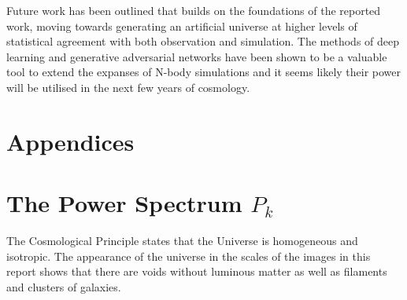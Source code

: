 \documentclass[twocolumn]{article}
\numberwithin{equation}{section}
\begin{document}
Future work has been outlined that builds on the foundations of the reported work, moving towards generating an artificial 
universe at higher levels of statistical agreement with both observation and simulation. The methods of deep learning and
generative adversarial networks have been shown to be a valuable tool to extend the expanses of N-body simulations and it 
seems likely their power will be utilised in the next few years of cosmology. 

{\footnotesize  %
}


\setcounter{section}{0}
\section*{Appendices}

%
\appendix


\section{The Power Spectrum $P_k$}\label{appendix:power_spectrum} 
The Cosmological Principle states that the Universe is homogeneous and isotropic. The appearance of the universe in the 
scales of the images in this report shows that there are voids without luminous matter as well as filaments and clusters 
of galaxies.
\end{document}
